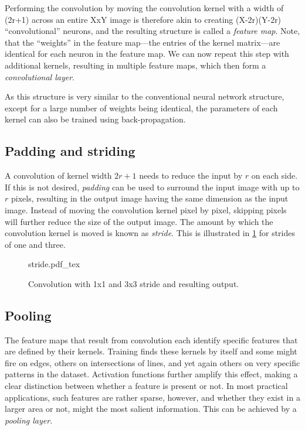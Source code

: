 Performing the convolution by moving the convolution kernel with a width of (2r+1) across an entire XxY image is therefore akin to creating (X-2r)(Y-2r) ``convolutional'' neurons, and the resulting structure is called a \textsl{feature map}. Note, that the ``weights'' in the feature map---the entries of the kernel matrix---are identical for each neuron in the feature map. We can now repeat this step with additional kernels, resulting in multiple feature maps, which then form a \textsl{convolutional layer}.

As this structure is very similar to the conventional neural network structure, except for a large number of weights being identical, the parameters of each kernel can also be trained using back-propagation. 

\subsection{Padding and striding}

A convolution of kernel width $2r+1$ needs to reduce the input by $r$ on each side. If this is not desired, \textsl{padding} can be used to surround the input image with up to $r$ pixels, resulting in the output image having the same dimension as the input image. Instead of moving the convolution kernel pixel by pixel, skipping pixels will further reduce the size of the output image. The amount by which the convolution kernel is moved is known as \textsl{stride}. This is illustrated in \cref{fig:stride} for strides of one and three.

\begin{figure}[htb]
    \centering
    \def\svgwidth{0.8\textwidth}
    {stride.pdf_tex}
    \caption{Convolution with 1x1 and 3x3 stride and resulting output.\label{fig:stride}}
\end{figure}

\subsection{Pooling}

The feature maps that result from convolution each identify specific features that are defined by their kernels. Training finds these kernels by itself and some might fire on edges, others on intersections of lines, and yet again others on very specific patterns in the dataset. Activation functions further amplify this effect, making a clear distinction between whether a feature is present or not. In most practical applications, such features are rather sparse, however, and whether they exist in a larger area or not, might the most salient information. This can be achieved by a \textsl{pooling layer}.


